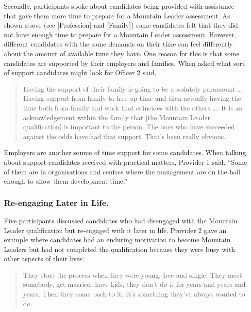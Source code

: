 \documentclass[
  12pt,
  a4paper,
]{book}
\begin{document}
Secondly, participants spoke about candidates being provided with assistance that gave them more time to prepare for a Mountain Leader assessment. As shown above (see {[}Profession{]} and {[}Family{]}) some candidates felt that they did not have enough time to prepare for a Mountain Leader assessment. However, different candidates with the same demands on their time can feel differently about the amount of available time they have. One reason for this is that some candidates are supported by their employers and families. When asked what sort of support candidates might look for Officer 2 said,

\begin{quote}
Having the support of their family is going to be absolutely paramount \ldots. Having support from family to free up time and then actually having the time both from family and work that coincides with the others \ldots. It is an acknowledgement within the family that {[}the Mountain Leader qualification{]} is important to the person. The ones who have succeeded against the odds have had that support. That's been really obvious.
\end{quote}

Employers are another source of time support for some candidates. When talking about support candidates received with practical matters, Provider 1 said, ``Some of them are in organisations and centres where the management are on the ball enough to allow them development time.''

\hypertarget{re-engaging-later-in-life.}{%
\subsubsection{Re-engaging Later in Life.}\label{re-engaging-later-in-life.}}

Five participants discussed candidates who had disengaged with the Mountain Leader qualification but re-engaged with it later in life. Provider 2 gave an example where candidates had an enduring motivation to become Mountain Leaders but had not completed the qualification because they were busy with other aspects of their lives:

\begin{quote}
They start the process when they were young, free and single. They meet somebody, get married, have kids, they don't do it for years and years and years. Then they come back to it. It's something they've always wanted to do.
\end{quote}
\end{document}

